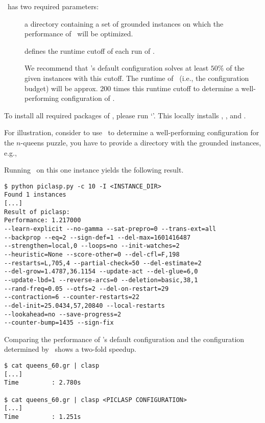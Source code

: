 \piclasp\ has two required parameters:
%
\begin{description}
  \item[] a directory containing a set of grounded instances on which the performance of \clasp\ will be optimized.
  \item[] defines the runtime cutoff of each run of \clasp. 

  		We recommend that \clasp's default configuration solves at least $50\%$ of the given instances with this cutoff.
  		The runtime of \piclasp\ (i.e., the configuration budget) will be approx. $200$ times this runtime cutoff 
  		to determine a well-performing configuration of \clasp.
\end{description} 

To install all required packages of \piclasp, please run `'.
This locally installs \clasp, \smac,  and \claspre.

For illustration, consider to use \piclasp\ to determine a well-performing configuration for the $n$-queens puzzle, 
you have to provide a directory with the grounded instances, e.g., 

Running \piclasp\ on this one instance yields the following result.
\begin{lstlisting}[numbers=none]
$ python piclasp.py -c 10 -I <INSTANCE_DIR>
Found 1 instances
[...]
Result of piclasp:
Performance: 1.217000
--learn-explicit --no-gamma --sat-prepro=0 --trans-ext=all
--backprop --eq=2 --sign-def=1 --del-max=1601416487
--strengthen=local,0 --loops=no --init-watches=2
--heuristic=None --score-other=0 --del-cfl=F,198
--restarts=L,705,4 --partial-check=50 --del-estimate=2
--del-grow=1.4787,36.1154 --update-act --del-glue=6,0
--update-lbd=1 --reverse-arcs=0 --deletion=basic,38,1
--rand-freq=0.05 --otfs=2 --del-on-restart=29 
--contraction=6 --counter-restarts=22 
--del-init=25.0434,57,20840 --local-restarts 
--lookahead=no --save-progress=2
--counter-bump=1435 --sign-fix
\end{lstlisting}

Comparing the performance of \clasp's default configuration
and the configuration determined by \piclasp\ shows a two-fold speedup.

\begin{lstlisting}[numbers=none]
$ cat queens_60.gr | clasp
[...]
Time         : 2.780s

$ cat queens_60.gr | clasp <PICLASP CONFIGURATION>
[...]
Time         : 1.251s
\end{lstlisting}

